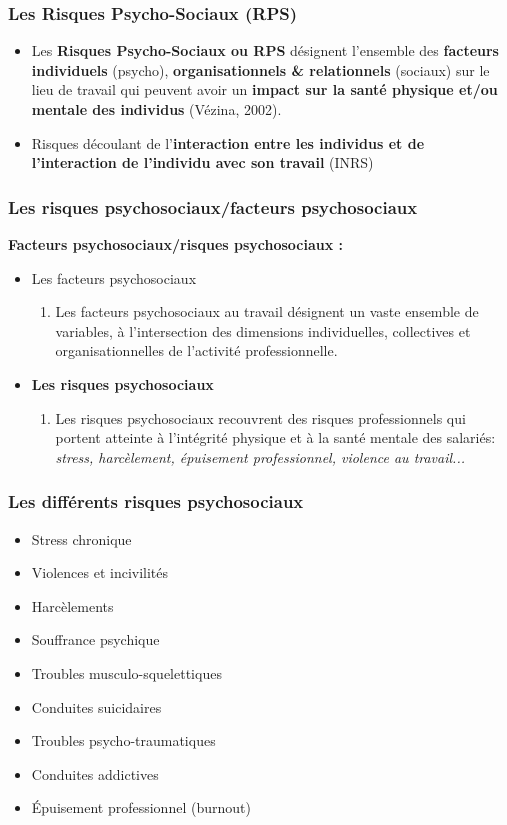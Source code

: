 \documentclass{beamer}
\begin{document}
\begin{frame}
\frametitle{Les Risques Psycho-Sociaux (RPS)}
\begin{itemize}
\item Les \textbf{Risques Psycho-Sociaux ou RPS} désignent l’ensemble des \textbf{facteurs individuels} (psycho), \textbf{organisationnels & relationnels} (sociaux) sur le lieu de travail qui peuvent avoir un \textbf{impact sur la santé physique et/ou mentale des individus} (Vézina, 2002).
\item Risques découlant de l’\textbf{interaction entre les individus et de l’interaction de l’individu avec son travail} (INRS)
\end{itemize}
\end{frame}

\begin{frame}
\frametitle{Les risques psychosociaux/facteurs psychosociaux}
\textbf{Facteurs psychosociaux/risques psychosociaux :}
\begin{itemize}
\item Les facteurs psychosociaux
\begin{enumerate}
\item Les facteurs psychosociaux au travail désignent un vaste ensemble de variables, à l'intersection des dimensions individuelles, collectives et organisationnelles de l'activité professionnelle.
\end{enumerate}
\item \textbf{Les risques psychosociaux}
\begin{enumerate}
\item Les risques psychosociaux recouvrent des risques professionnels qui portent atteinte à l’intégrité physique et à la santé mentale des salariés: \textit{stress, harcèlement, épuisement professionnel, violence au travail...}
\end{enumerate}
\end{itemize}
\end{frame}

\begin{frame}
\frametitle{Les différents risques psychosociaux}
\begin{itemize}
\item Stress chronique
\item Violences et incivilités
\item Harcèlements
\item Souffrance psychique
\item Troubles musculo-squelettiques
\item Conduites suicidaires
\item Troubles psycho-traumatiques
\item Conduites addictives
\item Épuisement professionnel (burnout)
\end{itemize}
\end{frame}
\end{document}
